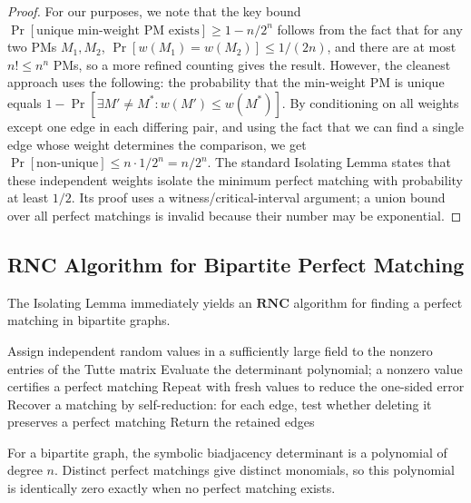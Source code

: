 \documentclass[twoside,12pt]{book}
\theoremstyle{plain}
\theoremstyle{definition}
\theoremstyle{remark}
\begin{document}
\begin{proof}
For our purposes, we note that the key bound $\Pr[\text{unique min-weight PM exists}] \geq 1 - n/2^n$ follows from the fact that for any two PMs $M_1, M_2$, $\Pr[w(M_1) = w(M_2)] \leq 1/(2n)$, and there are at most $n! \leq n^n$ PMs, so a more refined counting gives the result. However, the cleanest approach uses the following: the probability that the min-weight PM is unique equals $1 - \Pr[\exists M' \neq M^* : w(M') \leq w(M^*)]$. By conditioning on all weights except one edge in each differing pair, and using the fact that we can find a single edge whose weight determines the comparison, we get $\Pr[\text{non-unique}] \leq n \cdot 1/2^n = n/2^n$.
\fi
The standard Isolating Lemma states that these independent weights isolate
the minimum perfect matching with probability at least $1/2$.  Its proof
uses a witness/critical-interval argument; a union bound over all perfect
matchings is invalid because their number may be exponential.
\end{proof}

\subsection{RNC Algorithm for Bipartite Perfect Matching}
\label{subsec:rnc-matching}

The Isolating Lemma immediately yields an $\mathbf{RNC}$ algorithm for finding a perfect matching in bipartite graphs.

\begin{algorithm}[H]
\caption{Randomized Parallel Bipartite Perfect Matching}
\label{alg:bipartite-pm}
\begin{algorithmic}[1]
\State Assign independent random values in a sufficiently large field to the nonzero entries of the Tutte matrix
\State Evaluate the determinant polynomial; a nonzero value certifies a perfect matching
\State Repeat with fresh values to reduce the one-sided error
\State Recover a matching by self-reduction: for each edge, test whether deleting it preserves a perfect matching
\State Return the retained edges
\EndProcedure
\end{algorithmic}
\end{algorithm}

For a bipartite graph, the symbolic biadjacency determinant is a polynomial of
degree $n$. Distinct perfect matchings give distinct monomials, so this
polynomial is identically zero exactly when no perfect matching exists.
\end{document}
